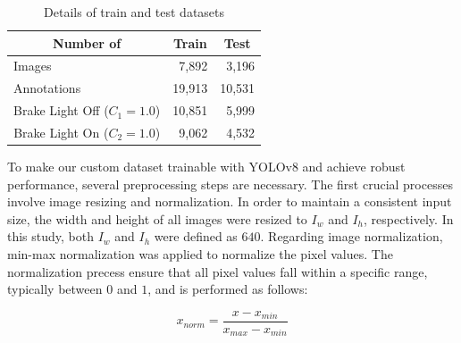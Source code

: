 \begin{table}[h]
    \caption{Details of train and test datasets}
    \label{tab:dataset}
    \begin{tabular}{p{5cm} p{5cm} p{5cm}}
    \toprule
    \multicolumn{1}{c}{Number of}                          & \multicolumn{1}{c}{Train} & \multicolumn{1}{c}{Test} \\
    \midrule
    Images                              & \multicolumn{1}{r}{7,892}                     & \multicolumn{1}{r}{3,196}                    \\
    Annotations                         & \multicolumn{1}{r}{19,913}                    & \multicolumn{1}{r}{10,531}                   \\
    \multicolumn{1}{c}{Brake Light Off ($C_{1}=1.0$)} & \multicolumn{1}{r}{10,851}                    & \multicolumn{1}{r}{5,999}                    \\
    \multicolumn{1}{c}{Brake Light On ($C_{2}=1.0$)}  & \multicolumn{1}{r}{9,062}                     & \multicolumn{1}{r}{4,532}                   \\
    \bottomrule
    \end{tabular}%
\end{table}









To make our custom dataset trainable with YOLOv8 and achieve robust performance, several preprocessing steps are necessary.
The first crucial processes involve image resizing and normalization.
In order to maintain a consistent input size, the width and height of all images were resized to $I_{w}$ and $I_{h}$, respectively. 
In this study, both $I_{w}$ and $I_{h}$ were defined as $640$.
Regarding image normalization, min-max normalization was applied to normalize the pixel values.
The normalization precess ensure that all pixel values fall within a specific range, typically between $0$ and $1$, and is performed as follows:

\begin{equation}
    x_{norm} = \frac{x - x_{min}}{x_{max} - x_{min}}
\end{equation}


